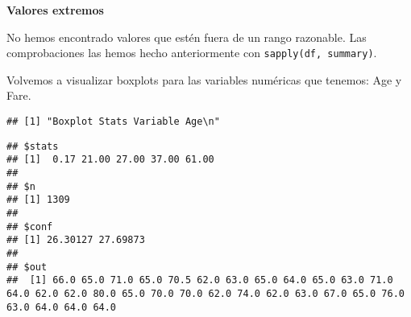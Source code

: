 \documentclass[
]{article}
\newenvironment{Shaded}{\begin{snugshade}}{\end{snugshade}}
\newcommand{\CharTok}[1]{\textcolor[rgb]{0.86,0.64,0.64}{#1}}
\newcommand{\CommentTok}[1]{\textcolor[rgb]{0.50,0.62,0.50}{#1}}
\newcommand{\DataTypeTok}[1]{\textcolor[rgb]{0.87,0.87,0.75}{#1}}
\newcommand{\DecValTok}[1]{\textcolor[rgb]{0.86,0.86,0.80}{#1}}
\newcommand{\FloatTok}[1]{\textcolor[rgb]{0.75,0.75,0.82}{#1}}
\newcommand{\KeywordTok}[1]{\textcolor[rgb]{0.94,0.87,0.69}{#1}}
\newcommand{\NormalTok}[1]{\textcolor[rgb]{0.80,0.80,0.80}{#1}}
\newcommand{\OperatorTok}[1]{\textcolor[rgb]{0.94,0.94,0.82}{#1}}
\newcommand{\OtherTok}[1]{\textcolor[rgb]{0.94,0.94,0.56}{#1}}
\newcommand{\StringTok}[1]{\textcolor[rgb]{0.80,0.58,0.58}{#1}}
\begin{document}
\textbf{Valores extremos}

No hemos encontrado valores que estén fuera de un rango razonable. Las
comprobaciones las hemos hecho anteriormente con
\texttt{sapply(df,\ summary)}.

Volvemos a visualizar boxplots para las variables numéricas que tenemos:
Age y Fare.

\begin{Shaded}
\end{Shaded}

\begin{verbatim}
## [1] "Boxplot Stats Variable Age\n"
\end{verbatim}

\begin{Shaded}
\end{Shaded}

\begin{verbatim}
## $stats
## [1]  0.17 21.00 27.00 37.00 61.00
## 
## $n
## [1] 1309
## 
## $conf
## [1] 26.30127 27.69873
## 
## $out
##  [1] 66.0 65.0 71.0 65.0 70.5 62.0 63.0 65.0 64.0 65.0 63.0 71.0 64.0 62.0 62.0 80.0 65.0 70.0 70.0 62.0 74.0 62.0 63.0 67.0 65.0 76.0 63.0 64.0 64.0 64.0
\end{verbatim}

\begin{Shaded}
\end{Shaded}
\end{document}
